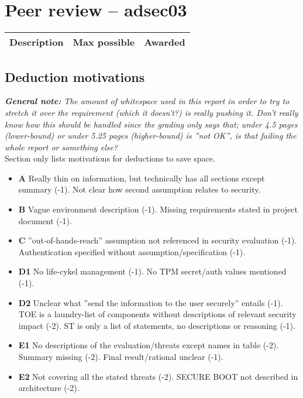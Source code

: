 \documentclass{article}
\begin{document}
	\section{Peer review -- adsec03}
	 \begin{tabular}{| l | c | c |}
        \hline
        \textbf{Description} & \textbf{Max possible} & \textbf{Awarded} \\
        \hline
        \hline
        
    \end{tabular}


    \subsection{Deduction motivations}
      \noindent
      \textit{\textbf{General note:} The amount of whitespace used in this
      report in order to try to stretch it over the requirement (which it
      doesn't?) is really pushing it. Don't really know how this should be
      handled since the grading only says that; under 4.5 pages (lower-bound)
      or under 5.25 pages (higher-bound) is ''not OK'', is that failing the whole
      report or something else?} \\

      \noindent
      Section only lists motivations for deductions to save space.

    	\begin{itemize}
    		\item{\textbf{A}
          Really thin on information, but technically has all
          sections except summary (-1). Not clear how second assumption relates
          to security.
        }
    		\item{\textbf{B}
          Vague environment description (-1). Missing requirements stated in project
          document (-1).}
        \item{\textbf{C} ''out-of-hands-reach'' assumption not referenced in
          security evaluation (-1). Authentication specified without
          assumption/specification (-1).
        }
    		\item{\textbf{D1}
          No life-cykel management (-1). No TPM secret/auth values mentioned
          (-1).
        }
    		\item{\textbf{D2}
          Unclear what ''send the information to the user securely'' entails
          (-1). TOE is a laundry-list of components without descriptions of
          relevant security impact (-2). ST is only a list of statements, no
          descriptions or reasoning (-1).
        }
    		\item{\textbf{E1}
          No descriptions of the evaluation/threats except names in table (-2).
          Summary missing
          (-2). Final result/rational unclear (-1).
        }
    		\item{\textbf{E2}
          Not covering all the stated threats (-2). SECURE BOOT not described
          in architecture (-2).
        }
    	\end{itemize}
\end{document}

